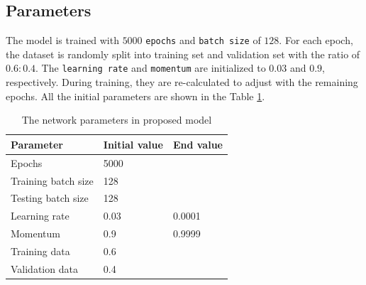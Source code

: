 \documentclass[12pt,a4paper]{article}
\begin{document}
\subsection{Parameters}
The model is trained with $5000$ \texttt{epochs} and \texttt{batch size} of $128$. For each epoch, the dataset is randomly split into training set and validation set with the ratio of $0.6:0.4$. The \texttt{learning rate} and \texttt{momentum} are initialized to $0.03$ and $0.9$, respectively. During training, they are re-calculated to adjust with the remaining epochs. All the initial parameters are shown in the Table \ref{initparameters}.
\begin{table}[h!]
	\centering
	\begin{tabular}{l l l}
	Parameter & Initial value & End value \\ \hline
	Epochs & 5000 &  \\ \hline
	Training batch size & 128 & \\ \hline
	Testing batch size & 128 & \\ \hline
	Learning rate & 0.03 & 0.0001 \\ \hline
	Momentum & 0.9 & 0.9999 \\ \hline
	Training data & 0.6 & \\ \hline
	Validation data & 0.4 &  \\ \hline
	\end{tabular}
	\caption{The network parameters in proposed model}
	\label{initparameters}
\end{table}
\end{document}
